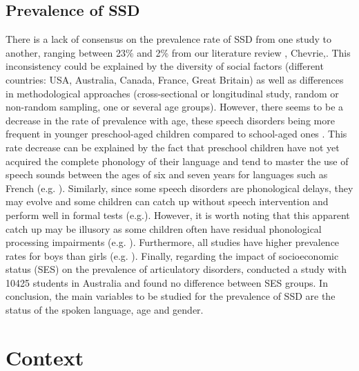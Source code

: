 \documentclass[output=paper,newtxmath,modfonts,nonflat,draftmode]{langsci/langscibook}
\begin{document}
\subsection{Prevalence of SSD}  %

There is a lack of consensus on the prevalence rate of SSD from one study to another, ranging between 23\% and 2\% from our literature review \cite{McKinnon2007, Shriberg1999, Fombonne1997, Beitchman1986, Enderby1986, Kirkpatrick1984, Silva1984, Silva1980, Peckman1980, Stevenson1976, Morley1972, Hull1971}, Chevrie,. This inconsistency could be explained by the diversity of social factors (different countries: USA, Australia, Canada, France, Great Britain) as well as differences in methodological approaches (cross-sectional or longitudinal study, random or non-random sampling, one or several age groups). However, there seems to be a decrease in the rate of prevalence with age, these speech disorders being more frequent in younger preschool-aged children compared to school-aged ones \citep{Morley1972}. This rate decrease can be explained by the fact that preschool children have not yet acquired the complete phonology of their language and tend to master the use of speech sounds between the ages of six and seven years for languages such as French (e.g. \citealt{Rvachew2013}). Similarly, since some speech disorders are phonological delays, they may evolve and some children can catch up without speech intervention and perform well in formal tests (e.g.\citealt{BishopEdmundson1987}). However, it is worth noting that this apparent catch up may be illusory as some children often have residual phonological processing impairments (e.g. \citealt{Stothard1998}). Furthermore, all studies have higher prevalence rates for boys than girls (e.g. \citealt{Shriberg1999}). Finally, regarding the impact of socioeconomic status (SES) on the prevalence of articulatory disorders, \citet{McKinnon2007} conducted a study with 10425 students in Australia and found no difference between SES groups. In conclusion, the main variables to be studied for the prevalence of SSD are the status of the spoken language, age and gender.

\section{Context} %
\end{document}
